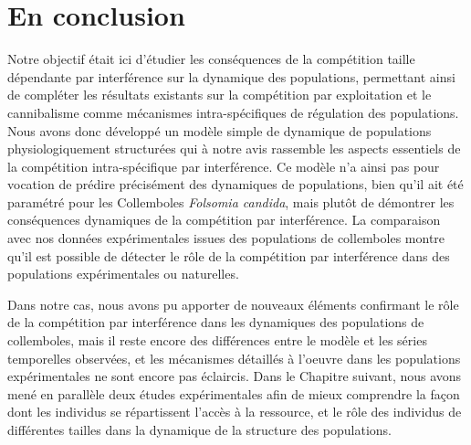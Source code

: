 \section{En conclusion}

Notre objectif était ici d'étudier les conséquences de la compétition taille
dépendante par interférence sur la dynamique des populations, permettant ainsi
de compléter les résultats existants sur la compétition par exploitation et le
cannibalisme comme mécanismes intra-spécifiques de régulation des populations.
Nous avons donc développé un modèle simple de dynamique de populations physiologiquement
structurées qui à notre avis rassemble les aspects essentiels de la compétition
intra-spécifique par interférence. Ce modèle n'a ainsi pas pour vocation de
prédire précisément des dynamiques de populations, bien qu'il ait été paramétré
pour les Collemboles \textit{Folsomia candida}, mais plutôt de démontrer les
conséquences dynamiques de la compétition par interférence. La comparaison avec
nos données expérimentales issues des populations de collemboles montre qu'il
est possible de détecter le rôle de la compétition par interférence dans des
populations expérimentales ou naturelles. 

Dans notre cas, nous avons pu apporter de nouveaux éléments confirmant le rôle
de la compétition par interférence dans les dynamiques des populations de
collemboles, mais il reste encore des différences entre le modèle et les séries
temporelles observées, et les mécanismes détaillés à l'oeuvre dans les
populations expérimentales ne sont encore pas éclaircis. Dans le Chapitre
suivant, nous avons mené en parallèle deux études expérimentales afin de mieux
comprendre la façon dont les individus se répartissent l'accès à la ressource,
et le rôle des individus de différentes tailles dans la dynamique de la structure
des populations.
